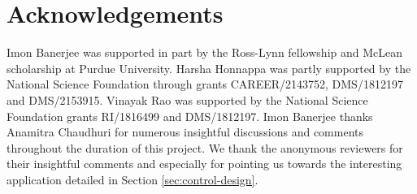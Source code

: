 \documentclass[opre,sglanonrev]{informs4}
\numberwithin{equation}{section}
\begin{document}

\section{Acknowledgements}
Imon Banerjee was supported in part by the Ross-Lynn fellowship and McLean scholarship at Purdue University. Harsha Honnappa was partly supported by the National Science Foundation through grants CAREER/2143752, DMS/1812197 and DMS/2153915. Vinayak Rao was supported by the National Science Foundation grants RI/1816499 and DMS/1812197. Imon Banerjee thanks Anamitra Chaudhuri for numerous insightful discussions and comments throughout the duration of this project. We thank the anonymous reviewers for their insightful comments and especially for pointing us towards the interesting application detailed in Section \ref{sec:control-design}.

\end{document}

